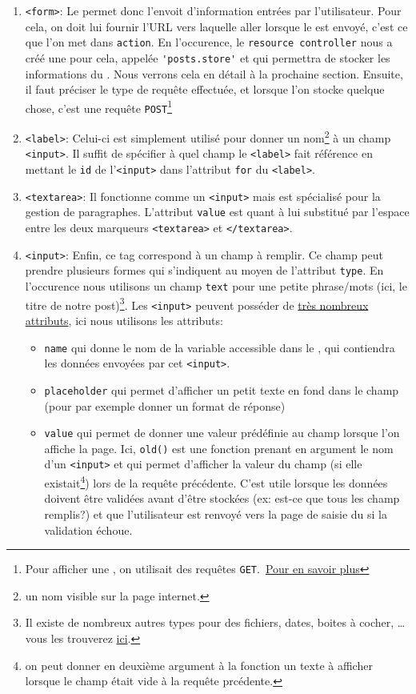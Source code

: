 \documentclass[internal]{nhitec_design}
\begin{document}
\begin{enumerate}
    \item \verb|<form>|: Le \form{} permet donc l'envoit d'information entrées par l'utilisateur. Pour cela, on doit lui fournir l'URL vers laquelle aller lorsque le \form{} est envoyé, c'est ce que l'on met dans \verb|action|. En l'occurence, le \texttt{resource controller} nous a créé une \route{} pour cela, appelée \verb|'posts.store'| et qui permettra de stocker les informations du \form{}. Nous verrons cela en détail à la prochaine section. Ensuite, il faut préciser le type de requête effectuée, et lorsque l'on stocke quelque chose, c'est une requête \verb|POST|\footnote{Pour afficher une \view, on utilisait des requêtes \verb|GET|.\ \href{https://developer.mozilla.org/fr/docs/Web/HTTP/Methods}{Pour en savoir plus}}
    \item \verb|<label>|: Celui-ci est simplement utilisé pour donner un nom\footnote{un nom visible sur la page internet.} à un champ \verb|<input>|. Il suffit de spécifier à quel champ le \verb|<label>| fait référence en mettant le \verb|id| de l'\verb|<input>| dans l'attribut \verb|for| du \verb|<label>|.
    \item \verb|<textarea>|: Il fonctionne comme un \verb|<input>| mais est spécialisé pour la gestion de paragraphes. L'attribut \verb|value| est quant à lui substitué par l'espace entre les deux marqueurs \verb|<textarea>| et \verb|</textarea>|.
    \item \verb|<input>|: Enfin, ce tag correspond à un champ à remplir. Ce champ peut prendre plusieurs formes qui s'indiquent au moyen de l'attribut \verb|type|. En l'occurence nous utilisons un champ \verb|text| pour une petite phrase/mots (ici, le titre de notre post)\footnote{Il existe de nombreux autres types pour des fichiers, dates, boites à cocher, \ldots vous les trouverez \href{https://developer.mozilla.org/en-US/docs/Web/HTML/Element/input#input_types}{ici}.}. Les \verb|<input>| peuvent posséder de \href{https://developer.mozilla.org/en-US/docs/Web/HTML/Element/input#attributes}{très nombreux attributs}, ici nous utilisons les attributs:
    \begin{itemize}
        \item \verb|name| qui donne le nom de la variable accessible dans le \controller{}, qui contiendra les données envoyées par cet \verb|<input>|.
        \item \verb|placeholder| qui permet d'afficher un petit texte en fond dans le champ (pour par exemple donner un format de réponse)
        \item \verb|value| qui permet de donner une valeur prédéfinie au champ lorsque l'on affiche la page. Ici, \verb|old()| est une fonction prenant en argument le nom d'un \verb|<input>| et qui permet d'afficher la valeur du champ (si elle existait\footnote{on peut donner en deuxième argument à la fonction un texte à afficher lorsque le champ était vide à la requête prcédente.}) lors de la requête précédente. C'est utile lorsque les données doivent être validées avant d'être stockées (ex: est-ce que tous les champ remplis?) et que l'utilisateur est renvoyé vers la page de saisie du \form{} si la validation échoue.
    \end{itemize}
\end{enumerate}
\end{document}
